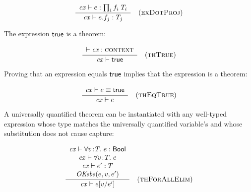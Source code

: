 \begin{theorem}\label{thm-edot}
{\rm
\[
\frac{\begin{array}{c}\mathit{cx}\vdash e:\prod_{i}f_i\;T_i\end{array}}{\mathit{cx}\vdash e.f_j:T_j}\quad\mbox{(\textsc{exDotProj})}
\]
}
\end{theorem}

The expression $\mathsf{true}$ is a theorem:

\begin{theorem}\label{thm-thtrue}
{\rm
\[
\frac{\begin{array}{c}\vdash\mathit{cx}:\textsc{context}\end{array}}{\mathit{cx}\vdash\mathsf{true}}\quad\mbox{(\textsc{thTrue})}
\]
}
\end{theorem}

Proving that an expression equals $\mathsf{true}$ implies that the expression is a
theorem:

\begin{theorem}\label{thm-theqtrue}
{\rm
\[
\frac{\begin{array}{c}\mathit{cx}\vdash e\equiv\mathsf{true}\end{array}}{\mathit{cx}\vdash e}\quad\mbox{(\textsc{thEqTrue})}
\]
}
\end{theorem}

A universally quantified theorem can be instantiated with any well-typed
expression whose type matches the universally quantified variable's and whose
substitution does not cause capture:

\begin{theorem}\label{thm-thfaelimO}
{\rm
\[
\frac{\begin{array}{c}\mathit{cx}\vdash\forall v\!:\!T.\;e:\mathsf{Bool}\\\mathit{cx}\vdash\forall v\!:\!T.\;e\\\mathit{cx}\vdash e':T\\\mathit{OKsbs}(e,v,e')\end{array}}{\mathit{cx}\vdash e[v/e']}\quad\mbox{(\textsc{thForAllElim})}
\]
}
\end{theorem}

